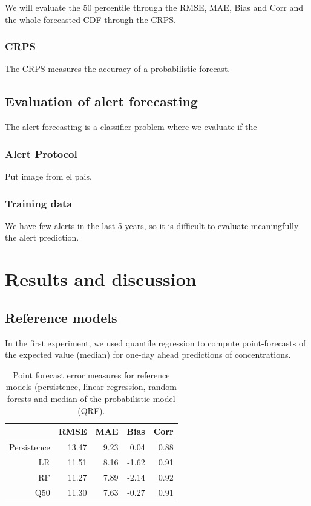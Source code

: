 \documentclass[a4paper,twocolumn,5p]{elsarticle}
\begin{document}
We will evaluate the 50 percentile through the RMSE, MAE, Bias and Corr and the whole forecasted CDF through the CRPS.

\subsubsection{CRPS}
\label{sec:eval-extr-value}

The CRPS measures the accuracy of a probabilistic forecast. 

\subsection{Evaluation of alert forecasting}
\label{sec:eval-extr-value}

The alert forecasting is a classifier problem where we evaluate if the 

\subsubsection{Alert Protocol}
Put image from el pais.

\subsubsection{Training data}
\label{sec:eval-extr-value}

We have few alerts in the last 5 years, so it is difficult to evaluate meaningfully the alert prediction.

\section{Results and discussion}
\label{sec:results}




\subsection{Reference models}
\label{sec:deterministic}

In the first experiment, we used quantile regression to compute
point-forecasts of the expected value (median) for one-day ahead
predictions of \no concentrations.

\begin{table}[tbp]
\caption{\label{tab:determ}Point forecast error measures for reference
models (persistence, linear regression, random forests and median of
the probabilistic model (QRF).}
  \centering
\begin{tabular}{rrrrr}
  \toprule
 & RMSE & MAE & Bias & Corr \\ 
  \midrule
  Persistence & 13.47 & 9.23 & 0.04 & 0.88 \\ 
  LR   & 11.51 & 8.16 & -1.62 & 0.91 \\ 
  RF   & 11.27 & 7.89 & -2.14 & 0.92 \\
  Q50  & 11.30 & 7.63 & -0.27 & 0.91 \\ 
   \bottomrule
\end{tabular}
\end{table}
\end{document}
